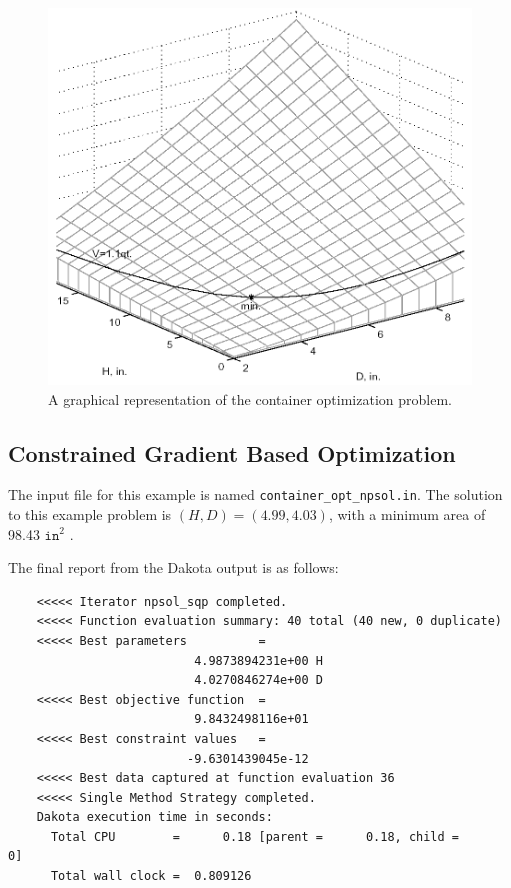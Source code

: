 \begin{figure}
  \centering
  \includegraphics[scale=0.3]{images/graphical_container_opt}
  \caption{A graphical representation of the container optimization
    problem.}
  \label{additional:figure02}
\end{figure}

\subsection{Constrained Gradient Based Optimization}

The input file for this example is named
\texttt{container\_opt\_npsol.in}. The solution to this example
problem is $(H,D)=(4.99,4.03)$, with a minimum area of 98.43
$\mathtt{in}^2$ .

The final report from the Dakota output is as follows:
\begin{small}
\begin{verbatim}
    <<<<< Iterator npsol_sqp completed.
    <<<<< Function evaluation summary: 40 total (40 new, 0 duplicate)
    <<<<< Best parameters          =
                          4.9873894231e+00 H
                          4.0270846274e+00 D
    <<<<< Best objective function  =
                          9.8432498116e+01
    <<<<< Best constraint values   =
                         -9.6301439045e-12
    <<<<< Best data captured at function evaluation 36
    <<<<< Single Method Strategy completed.
    Dakota execution time in seconds:
      Total CPU        =      0.18 [parent =      0.18, child =         0]
      Total wall clock =  0.809126
\end{verbatim}
\end{small}

